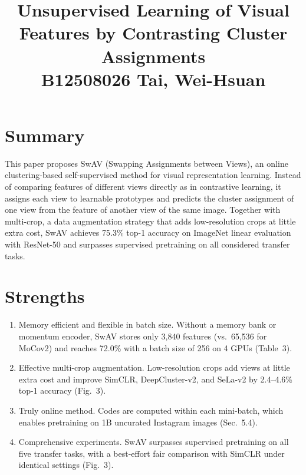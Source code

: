 \documentclass[10pt,twocolumn,letterpaper]{article}
\begin{document}
\title{Unsupervised Learning of Visual Features by Contrasting Cluster Assignments\\ B12508026 Tai, Wei-Hsuan}  %

\maketitle
\thispagestyle{empty}
\appendix


\section{Summary}
This paper proposes SwAV (Swapping Assignments between Views), an online clustering-based self-supervised method for visual representation learning.
Instead of comparing features of different views directly as in contrastive learning, it assigns each view to learnable prototypes and predicts the cluster assignment of one view from the feature of another view of the same image.
Together with multi-crop, a data augmentation strategy that adds low-resolution crops at little extra cost, SwAV achieves 75.3\% top-1 accuracy on ImageNet linear evaluation with ResNet-50 and surpasses supervised pretraining on all considered transfer tasks.

\section{Strengths}
\begin{enumerate}
    \item Memory efficient and flexible in batch size. Without a memory bank or momentum encoder, SwAV stores only 3{,}840 features (vs.\ 65{,}536 for MoCov2) and reaches 72.0\% with a batch size of 256 on 4 GPUs (Table~3).
    \item Effective multi-crop augmentation. Low-resolution crops add views at little extra cost and improve SimCLR, DeepCluster-v2, and SeLa-v2 by 2.4--4.6\% top-1 accuracy (Fig.~3).
    \item Truly online method. Codes are computed within each mini-batch, which enables pretraining on 1B uncurated Instagram images (Sec.~5.4).
    \item Comprehensive experiments. SwAV surpasses supervised pretraining on all five transfer tasks, with a best-effort fair comparison with SimCLR under identical settings (Fig.~3).
\end{enumerate}
\end{document}
